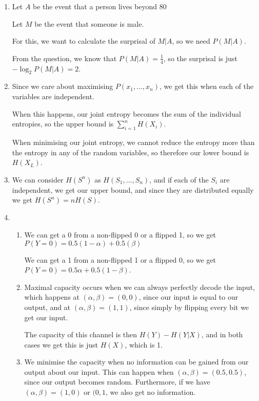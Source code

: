 


\begin{enumerate}[label=(\alph*)]
  \item
    Let $A$ be the event that a person lives beyond 80

    Let $M$ be the event that someone is male.

    For this, we want to calculate the surprisal of $M|A$, so we need $P(M|A)$.

    From the question, we know that $P(M|A) = \frac{1}{4}$, so the surprisal is just $-\log_2 P(M|A) = 2$.

  \item
    Since we care about maximising $P(x_1, \ldots, x_n)$, we get this when each of the variables are independent.

    When this happens, our joint entropy becomes the sum of the individual entropies, so the upper bound is $\sum_{i=1}^n H(X_i)$.

    When minimising our joint entropy, we cannot reduce the entropy more than the entropy in any of the random variables, so therefore our lower bound is $H(X_L)$.

  \item
    We can consider $H(S^n)$ as $H(S_1, \ldots, S_n)$, and if each of the $S_i$ are independent, we get our upper bound, and since they are distributed equally we get $H(S^n) = nH(S)$. 

  \item
    \begin{enumerate}[label=(\roman*)]
      \item

        We can get a 0 from a non-flipped 0 or a flipped 1, so we get $P(Y=0) = 0.5(1-\alpha) + 0.5(\beta)$

        We can get a 1 from a non-flipped 1 or a flipped 0, so we get $P(Y=0) = 0.5\alpha + 0.5(1-\beta)$.

      \item
        Maximal capacity occurs when we can always perfectly decode the input, which happens at $(\alpha,\beta) = (0,0)$, since our input is equal to our output, and at $(\alpha, \beta) = (1,1)$, since simply by flipping every bit we get our input.

        The capacity of this channel is then $H(Y) - H(Y|X)$, and in both cases we get this is just $H(X)$, which is 1.

      \item
        We minimise the capacity when no information can be gained from our output about our input. This can happen when $(\alpha, \beta) = (0.5, 0.5)$, since our output becomes random. Furthermore, if we have $(\alpha, \beta) = (1,0)$ or $(0,1$, we also get no information.


\end{enumerate}
\end{enumerate}
